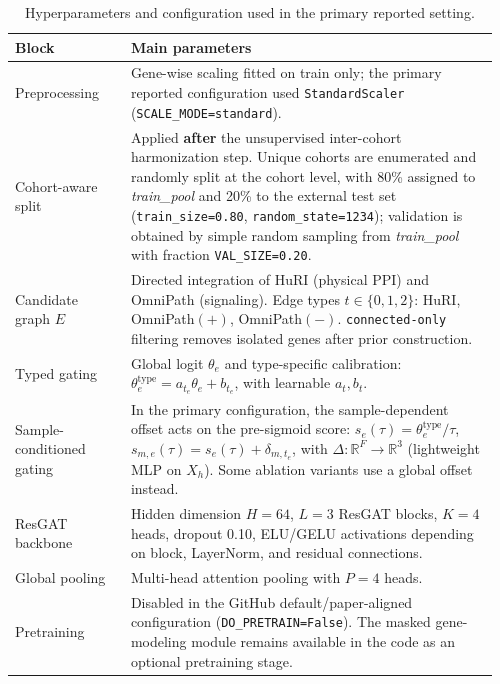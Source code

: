 \documentclass[11pt,a4paper]{article}
\newcommand{\R}{\mathbb{R}}
\begin{document}
\begin{table}[!htbp]
\centering
\caption{Hyperparameters and configuration used in the primary reported setting.}
\label{tab:sup_hyper}
\begin{tabular}{@{}p{0.23\linewidth}p{0.73\linewidth}@{}}
\toprule
\textbf{Block} & \textbf{Main parameters} \\
\midrule
Preprocessing &
Gene-wise scaling fitted on train only; the primary reported configuration used \texttt{StandardScaler} (\texttt{SCALE\_MODE=standard}). \\

Cohort-aware split &
Applied \textbf{after} the unsupervised inter-cohort harmonization step. Unique cohorts are enumerated and randomly split at the cohort level, with 80\% assigned to \emph{train\_pool} and 20\% to the external test set (\texttt{train\_size=0.80}, \texttt{random\_state=1234}); validation is obtained by simple random sampling from \emph{train\_pool} with fraction \texttt{VAL\_SIZE=0.20}. \\

Candidate graph $E$ &
Directed integration of HuRI (physical PPI) and OmniPath (signaling). Edge types $t\in\{0,1,2\}$: HuRI, OmniPath$(+)$, OmniPath$(-)$. \texttt{connected-only} filtering removes isolated genes after prior construction. \\

Typed gating &
Global logit $\theta_e$ and type-specific calibration: $\theta^{\mathrm{type}}_e=a_{t_e}\theta_e+b_{t_e}$, with learnable $a_t,b_t$. \\

Sample-conditioned gating &
In the primary configuration, the sample-dependent offset acts on the pre-sigmoid score:
$s_e(\tau)=\theta^{\mathrm{type}}_e/\tau$,
$s_{m,e}(\tau)=s_e(\tau)+\delta_{m,t_e}$,
with $\Delta:\R^F\to\R^{3}$ (lightweight MLP on $X_h$). Some ablation variants use a global offset instead. \\

ResGAT backbone &
Hidden dimension $H=64$, $L=3$ ResGAT blocks, $K=4$ heads, dropout 0.10, ELU/GELU activations depending on block, LayerNorm, and residual connections. \\

Global pooling &
Multi-head attention pooling with $P=4$ heads. \\

Pretraining &
Disabled in the GitHub default/paper-aligned configuration (\texttt{DO\_PRETRAIN=False}). The masked gene-modeling module remains available in the code as an optional pretraining stage. \\


\end{tabular}
\end{table}
\end{document}

